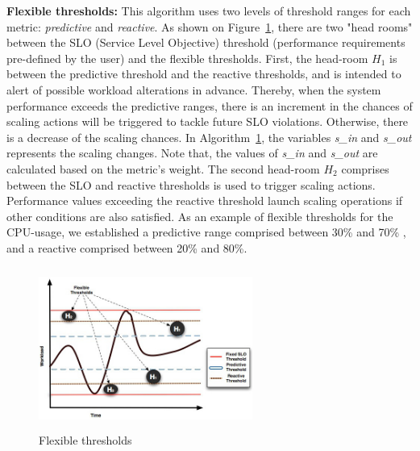 \textbf{Flexible thresholds:} This algorithm uses two levels of threshold ranges for each metric: \emph{predictive} and \emph{reactive}. As shown on Figure~\ref{flexibleThresholds}, there are two "head rooms" between the SLO (Service Level Objective) threshold (performance requirements pre-defined by the user) and the flexible thresholds.  First, the head-room $H_1$ is between the predictive threshold and the reactive thresholds, and is intended to alert of possible workload alterations in advance. Thereby, when the system performance exceeds the predictive ranges, there is an increment in the chances of scaling actions will be triggered to tackle future SLO violations. Otherwise, there is a decrease of the scaling chances. In Algorithm~\ref{flexibleThresholds}, the variables \emph{s\_in} and \emph{s\_out} represents the scaling changes.  Note that, the values of \emph{s\_in} and \emph{s\_out} are calculated based on the metric's weight. The second head-room $H_2$ comprises between the SLO and reactive thresholds is used to trigger scaling actions. Performance values exceeding the reactive threshold launch scaling operations if other conditions are also satisfied. As an example of flexible thresholds for the CPU-usage, we established a predictive range comprised between 30\% and 70\% , and a reactive comprised between 20\% and 80\%.  

\begin{figure}
\begin{center}
\includegraphics[width=7cm, height=5.3cm]{./images/thresholdGraphic.jpg}
\end{center}
\caption{Flexible thresholds}
\label{flexibleThresholds}
\end{figure}

